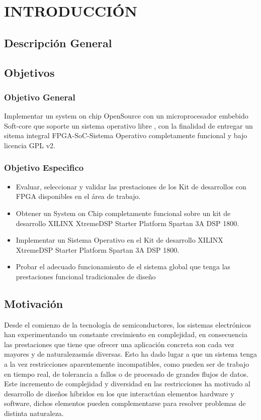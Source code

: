 \chapter{INTRODUCCIÓN}


\section{Descripción General}



\section{Objetivos}
\subsection{Objetivo General}

Implementar un system on chip OpenSource con un microprocesador embebido Soft-core que soporte un sistema operativo libre , con la finalidad de entregar un sitema integral FPGA-SoC-Sistema Operativo completamente funcional y bajo licencia GPL v2.


\subsection{Objetivo Especìfico}
\begin{itemize}
\item Evaluar, seleccionar y validar las prestaciones de los Kit de desarrollos con FPGA disponibles en el área de trabajo.
\item Obtener un System on Chip completamente funcional sobre un kit de desarrollo XILINX XtremeDSP Starter Platform Spartan 3A DSP 1800.
\item Implementar un Sistema Operativo en el Kit de desarrollo XILINX XtremeDSP Starter Platform Spartan 3A DSP 1800.
\item Probar el adecuado funcionamiento de el sistema global que tenga las  prestaciones funcional  
tradicionales de diseño
\end{itemize}

\section{Motivación} 

Desde el comienzo de la tecnología de semiconductores, los sistemas electrónicos han experimentando un constante crecimiento en complejidad, en consecuencia las prestaciones que tiene que ofrecer una aplicación concreta son cada vez mayores y de naturalezasmás diversas.
 Esto ha dado lugar a que un sistema tenga a la vez restricciones aparentemente incompatibles, como pueden ser de trabajo en tiempo real, de tolerancia a fallos o de procesado de grandes flujos de datos. 
Este incremento de complejidad y diversidad en las restricciones ha motivado  al desarrollo de diseños híbridos en los que interactúan elementos hardware y software, dichos elementos pueden complementarse para resolver problemas de distinta naturaleza.

